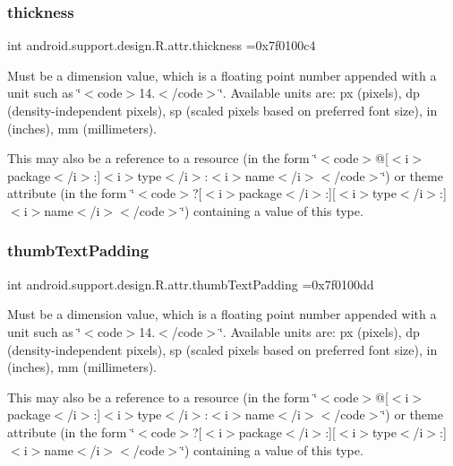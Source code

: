 \subsubsection{\texorpdfstring{thickness}{thickness}}
{\footnotesize\ttfamily int android.\+support.\+design.\+R.\+attr.\+thickness =0x7f0100c4\hspace{0.3cm}{\ttfamily [static]}}

Must be a dimension value, which is a floating point number appended with a unit such as \char`\"{}$<$code$>$14.\+5sp$<$/code$>$\char`\"{}. Available units are\+: px (pixels), dp (density-\/independent pixels), sp (scaled pixels based on preferred font size), in (inches), mm (millimeters). 

This may also be a reference to a resource (in the form \char`\"{}$<$code$>$@\mbox{[}$<$i$>$package$<$/i$>$\+:\mbox{]}$<$i$>$type$<$/i$>$\+:$<$i$>$name$<$/i$>$$<$/code$>$\char`\"{}) or theme attribute (in the form \char`\"{}$<$code$>$?\mbox{[}$<$i$>$package$<$/i$>$\+:\mbox{]}\mbox{[}$<$i$>$type$<$/i$>$\+:\mbox{]}$<$i$>$name$<$/i$>$$<$/code$>$\char`\"{}) containing a value of this type. \mbox{\label{classandroid_1_1support_1_1design_1_1R_1_1attr_a8bbe4fd2d86639ceb48400901fef0015}} 
\subsubsection{\texorpdfstring{thumb\+Text\+Padding}{thumbTextPadding}}
{\footnotesize\ttfamily int android.\+support.\+design.\+R.\+attr.\+thumb\+Text\+Padding =0x7f0100dd\hspace{0.3cm}{\ttfamily [static]}}

Must be a dimension value, which is a floating point number appended with a unit such as \char`\"{}$<$code$>$14.\+5sp$<$/code$>$\char`\"{}. Available units are\+: px (pixels), dp (density-\/independent pixels), sp (scaled pixels based on preferred font size), in (inches), mm (millimeters). 

This may also be a reference to a resource (in the form \char`\"{}$<$code$>$@\mbox{[}$<$i$>$package$<$/i$>$\+:\mbox{]}$<$i$>$type$<$/i$>$\+:$<$i$>$name$<$/i$>$$<$/code$>$\char`\"{}) or theme attribute (in the form \char`\"{}$<$code$>$?\mbox{[}$<$i$>$package$<$/i$>$\+:\mbox{]}\mbox{[}$<$i$>$type$<$/i$>$\+:\mbox{]}$<$i$>$name$<$/i$>$$<$/code$>$\char`\"{}) containing a value of this type. \mbox{\label{classandroid_1_1support_1_1design_1_1R_1_1attr_a1269cd6a0a69f93e03e342a0bca4f7a2}} 
